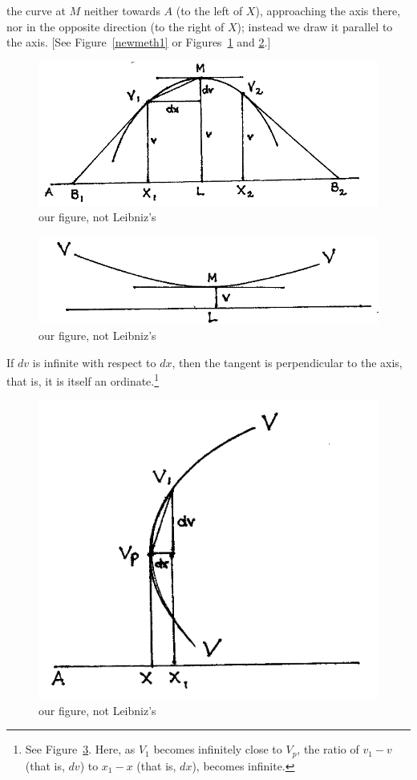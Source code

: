 \documentclass[polutonikogreek,english,twoside,openright]{article}
\begin{document}
the curve at $M$ neither towards $A$ (to the left of $X$), approaching
the axis there, nor in the opposite direction (to the right of $X$);
instead we draw it parallel to the axis. [See Figure~\ref{newmeth1} or
Figures~\ref{maxfig} and \ref{minfig}.]
\begin{figure}[htp]
  \begin{center}
    \includegraphics[width=.75\textwidth]{fig/Figure5}
    \caption{our figure, not Leibniz's}
    \label{maxfig}
  \end{center}
\end{figure}
\begin{figure}[htp]
  \begin{center}
    \includegraphics[width=.75\textwidth]{fig/Figure5A}
    \caption{our figure, not Leibniz's}
    \label{minfig}
  \end{center}
\end{figure}
If $dv$ is infinite with respect to $dx$, then the tangent is
perpendicular to the axis, that is, it is itself an
ordinate.\footnote{See Figure~\ref{verttang}.  Here, as $V_1$ becomes
  infinitely close to $V_p$, the ratio of $v_1 - v$ (that is, $dv$) to
  $x_1 - x$ (that is, $dx$), becomes infinite.}
\begin{figure}[htp]
  \begin{center}
    \includegraphics[width=.65\textwidth]{fig/Figure6}
    \caption{our figure, not Leibniz's}
    \label{verttang}
  \end{center}
\end{figure}
\end{document}
